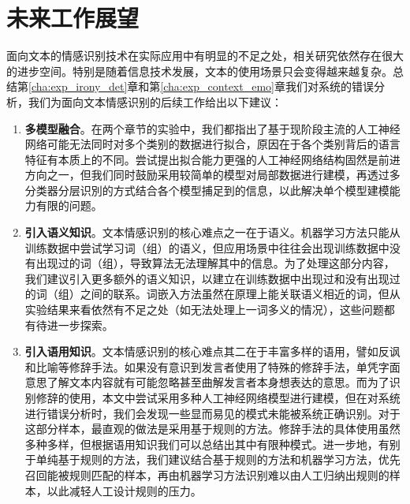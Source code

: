 \section{未来工作展望}

面向文本的情感识别技术在实际应用中有明显的不足之处，相关研究依然存在很大的进步空间。特别是随着信息技术发展，文本的使用场景只会变得越来越复杂。总结第\ref{cha:exp_irony_det}章和第\ref{cha:exp_context_emo}章我们对系统的错误分析，我们为面向文本情感识别的后续工作给出以下建议：

\begin{enumerate}

\item {\bf 多模型融合}。在两个章节的实验中，我们都指出了基于现阶段主流的人工神经网络可能无法同时对多个类别的数据进行拟合，原因在于各个类别背后的语言特征有本质上的不同。尝试提出拟合能力更强的人工神经网络结构固然是前进方向之一，但我们同时鼓励采用较简单的模型对局部数据进行建模，再透过多分类器分层识別的方式结合各个模型捕足到的信息，以此解决单个模型建模能力有限的问题。

\item {\bf 引入语义知识}。文本情感识别的核心难点之一在于语义。机器学习方法只能从训练数据中尝试学习词（组）的语义，但应用场景中往往会出现训练数据中没有出现过的词（组），导致算法无法理解其中的信息。为了处理这部分内容，我们建议引入更多额外的语义知识，以建立在训练数据中出现过和没有出现过的词（组）之间的联系。词嵌入方法虽然在原理上能关联语义相近的词，但从实验结果来看依然有不足之处（如无法处理上一词多义的情况），这些问题都有待进一步探索。

\item {\bf 引入语用知识}。文本情感识别的核心难点其二在于丰富多样的语用，譬如反讽和比喻等修辞手法。如果没有意识到发言者使用了特殊的修辞手法，单凭字面意思了解文本内容就有可能忽略甚至曲解发言者本身想表达的意思。而为了识别修辞的使用，本文中尝试采用多种人工神经网络模型进行建模，但在对系统进行错误分析时，我们会发现一些显而易见的模式未能被系统正确识别。对于这部分样本，最直观的做法是采用基于规则的方法。修辞手法的具体使用虽然多种多样，但根据语用知识我们可以总结出其中有限种模式。进一步地，有别于单纯基于规则的方法，我们建议结合基于规则的方法和机器学习方法，优先召回能被规则匹配的样本，再由机器学习方法识别难以由人工归纳出规则的样本，以此减轻人工设计规则的压力。

\end{enumerate}







